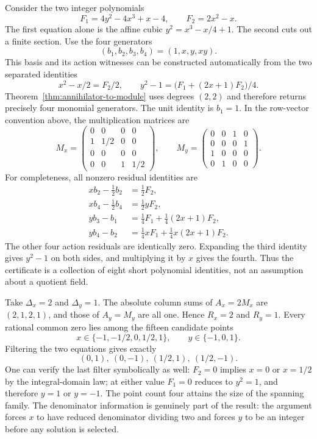 Consider the two integer polynomials
\[
 F_1=4y^2-4x^3+x-4,
 \qquad F_2=2x^2-x.
\]
The first equation alone is the affine cubic
$y^2=x^3-x/4+1$.  The second cuts out a finite section.  Use the
four generators
\[
             (b_1,b_2,b_3,b_4)=(1,x,y,xy).
\]
This basis and its action witnesses can be constructed automatically
from the two separated identities
\[
 x^2-x/2=F_2/2,
 \qquad y^2-1=\bigl(F_1+(2x+1)F_2\bigr)/4.
\]
Theorem~\ref{thm:annihilator-to-module} uses degrees $(2,2)$
and therefore returns precisely four monomial generators.
The unit identity is $b_1=1$.  In the row-vector convention above,
the multiplication matrices are
\[
 M_x=\begin{pmatrix}
 0&0&0&0\\
 1&1/2&0&0\\
 0&0&0&0\\
 0&0&1&1/2
 \end{pmatrix},
 \qquad
 M_y=\begin{pmatrix}
 0&0&1&0\\
 0&0&0&1\\
 1&0&0&0\\
 0&1&0&0
 \end{pmatrix}.
\]
For completeness, all nonzero residual identities are
\begin{align*}
 x b_2-\tfrac12 b_2&=\tfrac12 F_2,\\
 x b_4-\tfrac12 b_4&=\tfrac12 yF_2,\\
 y b_3-b_1&=\tfrac14 F_1+\tfrac14(2x+1)F_2,\\
 y b_4-b_2&=\tfrac14 xF_1+\tfrac14x(2x+1)F_2.
\end{align*}
The other four action residuals are identically zero.  Expanding the
third identity gives $y^2-1$ on both sides, and multiplying it by
$x$ gives the fourth.  Thus the certificate is a collection of eight
short polynomial identities, not an assumption about a quotient field.

Take $\Delta_x=2$ and $\Delta_y=1$.  The absolute column sums of
$A_x=2M_x$ are $(2,1,2,1)$, and those of $A_y=M_y$ are all one.
Hence $R_x=2$ and $R_y=1$.  Every rational common zero lies among
the fifteen candidate points
\[
 x\in\{-1,-1/2,0,1/2,1\},
 \qquad y\in\{-1,0,1\}.
\]
Filtering the two equations gives exactly
\[
                 (0,1),\ (0,-1),\ (1/2,1),\ (1/2,-1).
\]
One can verify the last filter symbolically as well: $F_2=0$
implies $x=0$ or $x=1/2$ by the integral-domain law; at either
value $F_1=0$ reduces to $y^2=1$, and therefore $y=1$ or $y=-1$.
The point count four attains the size of the spanning family.  The
denominator information is genuinely part of the result: the argument
forces $x$ to have reduced denominator dividing two and forces $y$
to be an integer before any solution is selected.

